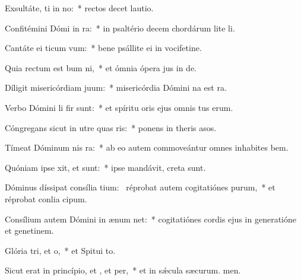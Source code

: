 \item Exsultáte, ti in no:~* rectos decet lautio.
\item Confitémini Dómi in ra:~* in psaltério decem chordárum lite li.
\item Cantáte ei ticum vum:~* bene psállite ei in vocifetine.
\item Quia rectum est bum ni,~* et ómnia ópera jus in de.
\item Díligit misericórdiam  juum:~* misericórdia Dómini na est ra.
\item Verbo Dómini li fir sunt:~* et spíritu oris ejus omnis tus erum.
\item Cóngregans sicut in utre quas ris:~* ponens in theris asos.
\item Tímeat Dóminum nis ra:~* ab eo autem commoveántur omnes inhabites bem.
\item Quóniam ipse xit, et  sunt:~* ipse mandávit,  creta sunt.
\item Dóminus díssipat consília tium:~\pscross{} réprobat autem cogitatiónes purum,~* et réprobat conlia cipum.
\item Consílium autem Dómini in ænum net:~* cogitatiónes cordis ejus in generatióne et genetinem.
\item Glória tri, et o,~* et Spitui to.
\item Sicut erat in princípio, et , et per,~* et in sǽcula sæcurum. men.
